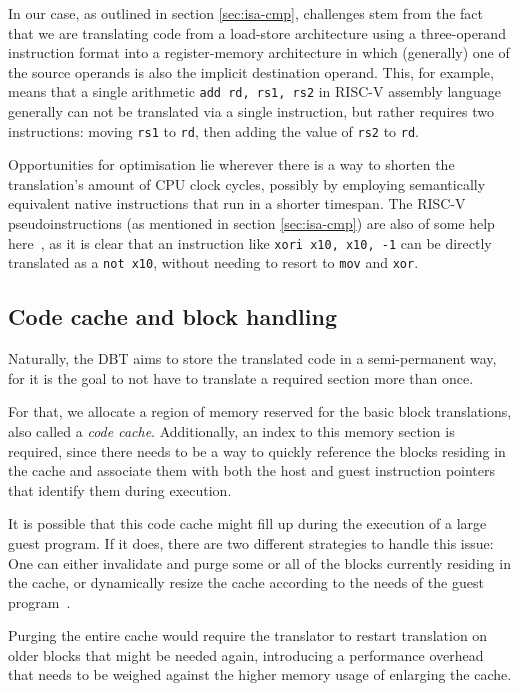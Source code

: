 In our case, as outlined in section \vref{sec:isa-cmp}, challenges stem from the fact that we are translating code from a load-store architecture using a three-operand instruction format into a register-memory architecture in which (generally) one of the source operands is also the implicit destination operand.
This, for example, means that a single arithmetic \texttt{add rd, rs1, rs2} in RISC-V assembly language generally can not be translated via a single instruction, but rather requires two instructions: moving \texttt{rs1} to \texttt{rd}, then adding the value of \texttt{rs2} to \texttt{rd}.

Opportunities for optimisation lie wherever there is a way to shorten the translation's amount of CPU clock cycles, possibly by employing semantically equivalent native instructions that run in a shorter timespan.
The RISC-V pseudoinstructions (as mentioned in section \ref{sec:isa-cmp}) are also of some help here~\cite[S. 139]{riscvspec}, as it is clear that an instruction like \texttt{xori x10, x10, -1} can be directly translated as a \texttt{not x10}, without needing to resort to \texttt{mov} and \texttt{xor}.


\subsection{Code cache and block handling}
Naturally, the DBT aims to store the translated code in a semi-permanent way, for it is the goal to not have to translate a required section more than once.

For that, we allocate a region of memory reserved for the basic block translations, also called a \textit{code cache}.
Additionally, an index to this memory section is required, since there needs to be a way to quickly reference the blocks residing in the cache and associate them with both the host and guest instruction pointers that identify them during execution.


It is possible that this code cache might fill up during the execution of a large guest program.
If it does, there are two different strategies to handle this issue:
One can either invalidate and purge some or all of the blocks currently residing in the cache, or dynamically resize the cache according to the needs of the guest program~\cite[S. 3]{bintrans}.

Purging the entire cache would require the translator to restart translation on older blocks that might be needed again, introducing a performance overhead that needs to be weighed against the higher memory usage of enlarging the cache.

